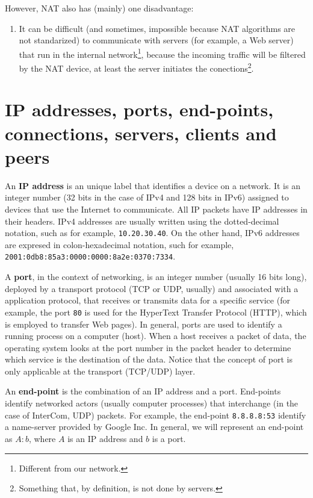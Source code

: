 However, NAT also has (mainly) one disadvantage:
\begin{enumerate}
\item It can be difficult (and sometimes, impossible because NAT
  algorithms are not standarized) to communicate with servers (for
  example, a Web server) that run in the internal
  network\footnote{Different from our network.}, because the incoming
  traffic will be filtered by the NAT device, at least the server
  initiates the conections\footnote{Something that, by definition, is
    not done by servers.}.
\end{enumerate}

\section{IP addresses, ports, end-points, connections, servers, clients and peers}

An \textbf{IP address} is an unique label that identifies a device on a
network. It is an integer number (32 bits in the case of IPv4 and 128
bits in IPv6) assigned to devices that use the Internet to
communicate. All IP packets have IP addresses in their headers. IPv4
addresses are usually written using the dotted-decimal notation, such
as for example, \texttt{10.20.30.40}. On the other hand, IPv6
addresses are expresed in colon-hexadecimal notation, such for
example, \texttt{2001:0db8:85a3:0000:0000:8a2e:0370:7334}.

A \textbf{port}, in the context of networking, is an integer number
(usually 16 bits long), deployed by a transport protocol (TCP or UDP,
usually) and associated with a application protocol, that receives or
transmits data for a specific service (for example, the port
\texttt{80} is used for the HyperText Transfer Protocol (HTTP), which
is employed to transfer Web pages). In general, ports are used to
identify a running process on a computer (host). When a host receives
a packet of data, the operating system looks at the port number in the
packet header to determine which service is the destination of the
data. Notice that the concept of port is only applicable at the
transport (TCP/UDP) layer.

An \textbf{end-point} is the combination of an IP address and a
port. End-points identify networked actors (usually computer
processes) that interchange (in the case of InterCom, UDP)
packets. For example, the end-point \texttt{8.8.8.8:53} identify a
name-server provided by Google Inc. In general, we will represent an
end-point as $A:b$, where $A$ is an IP address and $b$ is a port.

